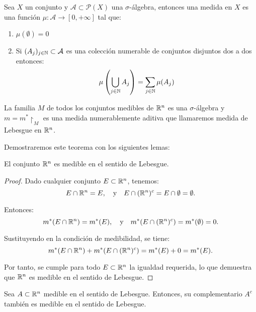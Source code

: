 \label{Medida}
\begin{definición}
Sea $X$ un conjunto y $\mathcal{A} \subset \mathcal{P}(X)$ una $\sigma$-álgebra, entonces una medida en $X$ es una función $\mu: \mathcal{A} \to [0, +\infty]$ tal que:
\begin{enumerate}
    \item $\mu(\emptyset) = 0$
    \item Si $(A_j)_{j \in \mathbb{N}} \subset \mathcal{A}$ es una colección numerable de
          conjuntos disjuntos dos a dos entonces: $$\mu\left(\bigcup_{j \in \mathbb{N}} A_j\right) = \sum_{j
                  \in \mathbb{N}} \mu(A_j)$$
\end{enumerate}
\end{definición}

\begin{teorema}
    La familia $M$ de todos los conjuntos medibles de $\mathbb{R}^n$ es una $\sigma$-álgebra y $m = m^* \restriction_M$ es una medida numerablemente aditiva que llamaremos medida de Lebesgue en $\mathbb{R}^n$.\label{Medida de Lebesgue en Rn}
\end{teorema}

Demostraremos este teorema con los siguientes lemas:

\begin{lema}
    El conjunto $\mathbb{R}^n$ es medible en el sentido de Lebesgue.
\end{lema}

\begin{proof}
    Dado cualquier conjunto $E \subset \mathbb{R}^n$, tenemos:
    \[
        E \cap \mathbb{R}^n = E,
        \quad \text{y} \quad
        E \cap (\mathbb{R}^n)^c = E \cap \emptyset = \emptyset.
    \]
    
    Entonces:
    \[
        m^*(E \cap \mathbb{R}^n) = m^*(E),
        \quad \text{y} \quad
        m^*(E \cap (\mathbb{R}^n)^c) = m^*(\emptyset) = 0.
    \]
    
    Sustituyendo en la condición de medibilidad, se tiene:
    \[
        m^*(E \cap \mathbb{R}^n) + m^*(E \cap (\mathbb{R}^n)^c) = m^*(E) + 0 = m^*(E).
    \]
    
    Por tanto, se cumple para todo $E \subset \mathbb{R}^n$ la igualdad requerida, lo que demuestra que $\mathbb{R}^n$ es medible en el sentido de Lebesgue.
\end{proof}


\begin{lema}
    Sea $A \subset \mathbb{R}^n$ medible en el sentido de Lebesgue. Entonces, su complementario $A^c$ también es medible en el sentido de Lebesgue.
    \label{lemaComplementarioMedible}
\end{lema}

